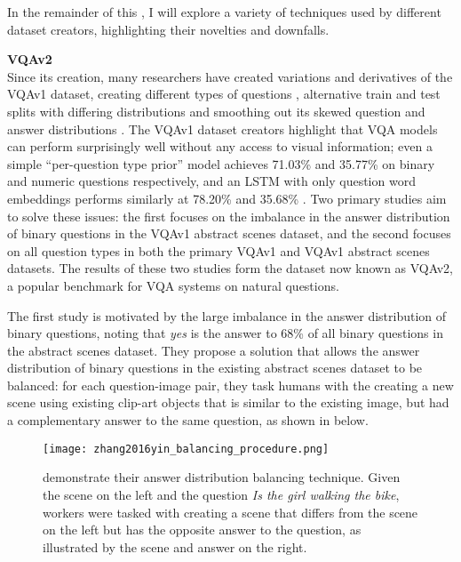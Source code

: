 In the remainder of this \subsectionautorefname, I will explore a variety of techniques used by different dataset creators, highlighting their novelties and downfalls.

\textbf{VQAv2}\\
Since its creation, many researchers have created variations and derivatives of the VQAv1 dataset, creating different types of questions \cite{agrawal2017cvqa}, alternative train and test splits with differing distributions \cite{agrawal2018dont} and smoothing out its skewed question and answer distributions \cite{zhang2016yin, goyal2017making}. The VQAv1 dataset creators highlight that VQA models can perform surprisingly well without any access to visual information; even a simple ``per-question type prior'' model achieves 71.03\% and 35.77\% on binary and numeric questions respectively, and an LSTM with only question word embeddings performs similarly at 78.20\% and 35.68\% \cite{antol2015vqa}. Two primary studies aim to solve these issues: the first \cite{zhang2016yin} focuses on the imbalance in the answer distribution of binary questions in the VQAv1 abstract scenes dataset, and the second \cite{goyal2017making} focuses on all question types in both the primary VQAv1 and VQAv1 abstract scenes datasets. The results of these two studies form the dataset now known as VQAv2, a popular benchmark for VQA systems on natural questions.

The first study is motivated by the large imbalance in the answer distribution of binary questions, noting that \textit{yes} is the answer to 68\% of all binary questions in the abstract scenes dataset. They propose a solution that allows the answer distribution of binary questions in the existing abstract scenes dataset to be balanced: for each question-image pair, they task humans with the creating a new scene using existing clip-art objects \cite{zitnick2013bringing} that is similar to the existing image, but had a complementary answer to the same question, as shown in \figureautorefname{  \ref{fig:zhang2016yin_balancing_procedure}} below.

\begin{figure}[H]
    \centering
    \texttt{[image: zhang2016yin\_balancing\_procedure.png]}
    \caption[A technique for balancing answers to binary questions \cite{zhang2016yin}]{\citeauthor{zhang2016yin} \cite{zhang2016yin} demonstrate their answer distribution balancing technique. Given the scene on the left and the question \textit{Is the girl walking the bike}, workers were tasked with creating a scene that differs from the scene on the left but has the opposite answer to the question, as illustrated by the scene and answer on the right.}
    \label{fig:zhang2016yin_balancing_procedure}
\end{figure}

